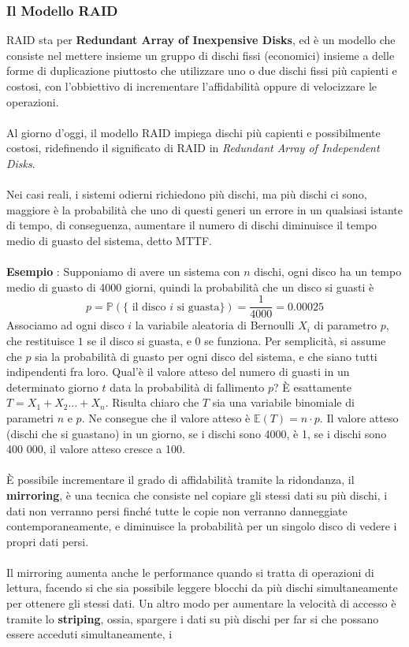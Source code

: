 \documentclass[12pt, letterpaper]{article}
\newcommand{\acc}{\\\hphantom{}\\}
\begin{document}
\subsubsection{Il Modello RAID}
RAID sta per \textbf{Redundant Array of Inexpensive Disks}, ed è un modello che consiste nel mettere insieme un gruppo 
di dischi fissi (economici) insieme a delle forme di duplicazione piuttosto che utilizzare uno o due dischi fissi 
più capienti e costosi, con l'obbiettivo di incrementare l'affidabilità oppure di velocizzare le operazioni.
\acc 
Al giorno d'oggi, il modello RAID impiega dischi più capienti e possibilmente costosi, ridefinendo il significato 
di RAID in \textit{Redundant Array of Independent Disks}.\acc 
Nei casi reali, i sistemi odierni richiedono più dischi, ma più dischi ci sono, maggiore è la probabilità che 
uno di questi generi un errore in un qualsiasi istante di tempo, di conseguenza, aumentare il numero di dischi 
diminuisce il tempo medio di guasto del sistema, detto MTTF.\acc 
\textbf{Esempio }: Supponiamo di avere un sistema con \(n\) dischi, ogni disco ha un tempo medio di guasto 
di 4000 giorni, quindi la probabilità che un disco si guasti è 
$$p=\mathbb{P}(\{\text{ il disco }i\text{ si guasta}\})=\dfrac{1}{4000}=0.00025$$
Associamo ad ogni disco \(i\) la variabile aleatoria di Bernoulli \(X_i\) di parametro \(p\), che restituisce \(1\) 
se il disco si guasta, e \(0\) se funziona. Per semplicità, si assume che \(p\) sia la probabilità di guasto per ogni 
disco del sistema, e che siano tutti indipendenti fra loro. Qual'è il valore atteso del numero di guasti in un determinato 
giorno \(t\) data la probabilità di fallimento \(p\)? È esattamente \(T=X_1+X_2\dots+X_n\). Risulta chiaro che \(T\) sia 
una variabile binomiale di parametri \(n\) e \(p\). Ne consegue che il valore atteso è \(\mathbb{E}(T)=n\cdot p\).
Il valore atteso (dischi che si guastano) in un giorno, se i dischi sono 4000, è 1, se i dischi sono 400 000, 
il valore atteso cresce a 100.
\acc 
È possibile incrementare il grado di affidabilità tramite la ridondanza, il \textbf{mirroring}, è una tecnica che consiste 
nel copiare gli stessi dati su più dischi, i dati non verranno persi finché tutte le copie non verranno danneggiate 
contemporaneamente, e diminuisce la probabilità per un singolo disco di vedere i propri dati persi.\acc 
Il mirroring aumenta anche le performance quando si tratta di operazioni di lettura, facendo si che sia possibile leggere 
blocchi da più dischi simultaneamente per ottenere gli stessi dati. Un altro modo per aumentare la velocità di accesso 
è tramite lo \textbf{striping}, ossia, spargere i dati su più dischi per far si che possano essere acceduti simultaneamente, i 
\end{document}
